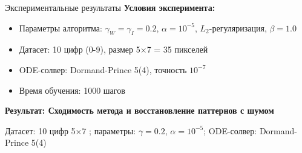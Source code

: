 \documentclass[10pt, aspectratio=169]{beamer}
\theoremstyle{plain}
\begin{document}
\begin{frame}{Экспериментальные результаты}
  \textbf{Условия эксперимента:}
  \begin{itemize}
    \item Параметры алгоритма: \(\gamma_W = \gamma_I = 0.2\), \(\alpha = 10^{-5}\), \(L_2\)-регуляризация, \(\beta = 1.0\)
    \item Датасет: 10 цифр (0-9), размер 5×7 = 35 пикселей
    \item ODE-солвер: Dormand-Prince 5(4), точность \(10^{-7}\) \cite{hairer1993}
    \item Время обучения: 1000 шагов
  \end{itemize}

  \textbf{Результат: Сходимость метода и восстановление паттернов с шумом}
  \begin{center}
  \end{center}

  \small{Датасет: 10 цифр 5×7 \cite{hertz1991}; параметры: \(\gamma=0.2\), \(\alpha=10^{-5}\); ODE-солвер: Dormand-Prince 5(4) \cite{hairer1993}}
\end{frame}
\end{document}
